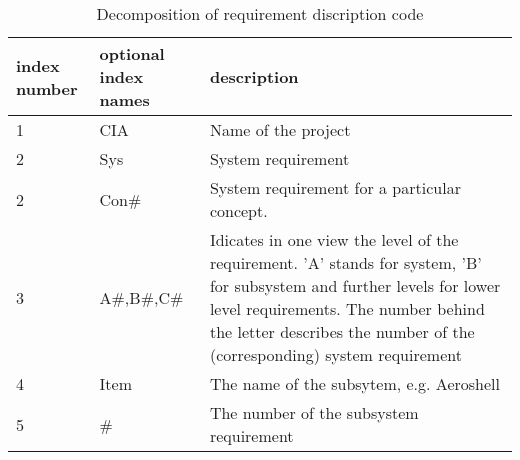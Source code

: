 \begin{table}[H]
    \caption {Decomposition of requirement discription code}
    \begin{tabular}{|p{}|p{}|p{}|}
    \hline
    index number & optional index names    & description                                                                                                                                  \\ \hline \hline
    1            & CIA                     & Name of the project                                                                                                                           \\ \hline
    2            & Sys                     & System requirement                                                                                                                           \\ \hline
    2            & Con#                    & System requirement for a particular concept.
\\ \hline
    3            & A#,B#,C#                & Idicates in one view the level of the requirement. 'A' stands for system, 'B' for subsystem  and further levels for lower level requirements. The number behind the letter describes the number of the (corresponding) system requirement
\\ \hline
    4            & Item                    & The name of the subsytem, e.g. Aeroshell                                                                                                     \\ \hline
    5            & #			           & The number of the subsystem requirement                                                                                                      \\ \hline
    \end{tabular}
    \label{tab:description}
\end{table}

